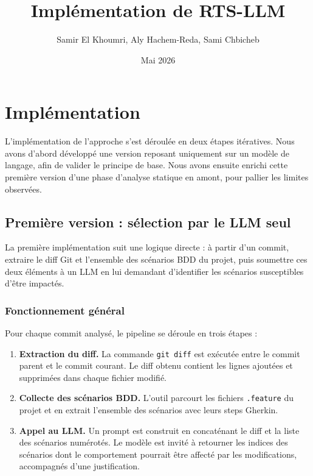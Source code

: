 \documentclass[12pt,a4paper]{article}
\title{\textbf{Implémentation de RTS-LLM}}
\author{Samir El Khoumri, Aly Hachem-Reda, Sami Chbicheb}
\date{Mai 2026}
\begin{document}
\maketitle
\tableofcontents
\newpage

\section{Implémentation}

L'implémentation de l'approche s'est déroulée en deux étapes itératives.
Nous avons d'abord développé une version reposant uniquement sur un modèle
de langage, afin de valider le principe de base. Nous avons ensuite enrichi
cette première version d'une phase d'analyse statique en amont, pour pallier
les limites observées.

\subsection{Première version : sélection par le LLM seul}

La première implémentation suit une logique directe : à partir d'un commit,
extraire le diff Git et l'ensemble des scénarios BDD du projet, puis
soumettre ces deux éléments à un LLM en lui demandant d'identifier les
scénarios susceptibles d'être impactés.

\subsubsection{Fonctionnement général}

Pour chaque commit analysé, le pipeline se déroule en trois étapes :

\begin{enumerate}[noitemsep]
  \item \textbf{Extraction du diff.} La commande \texttt{git diff} est
        exécutée entre le commit parent et le commit courant. Le diff
        obtenu contient les lignes ajoutées et supprimées dans chaque
        fichier modifié.

  \item \textbf{Collecte des scénarios BDD.} L'outil parcourt les fichiers
        \texttt{.feature} du projet et en extrait l'ensemble des scénarios
        avec leurs steps Gherkin.

  \item \textbf{Appel au LLM.} Un prompt est construit en concaténant le
        diff et la liste des scénarios numérotés. Le modèle est invité à
        retourner les indices des scénarios dont le comportement pourrait
        être affecté par les modifications, accompagnés d'une justification.
\end{enumerate}
\end{document}
